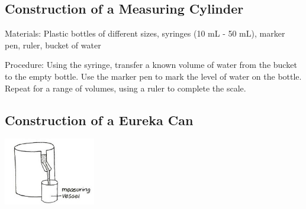 \begin{multicols}{2}
\subsection{Construction of a Measuring Cylinder}
\label{sub:meascyl}


\begin{description*}
\item[Materials:]{Plastic bottles of different sizes, syringes (10 mL - 50 mL), marker pen, ruler, bucket of water}
\item[Procedure:]{Using the syringe, transfer a known volume of water from the bucket to the empty bottle. Use the marker pen to mark the level of water on the bottle. Repeat for a range of volumes, using a ruler to complete the scale.}
\end{description*}

\subsection{Construction of a Eureka Can}
\label{sub:eurekacan}

\begin{center}
\includegraphics[width=0.3\textwidth]{./img/vso/overflow-can.jpg}
\end{center}


\end{multicols}
